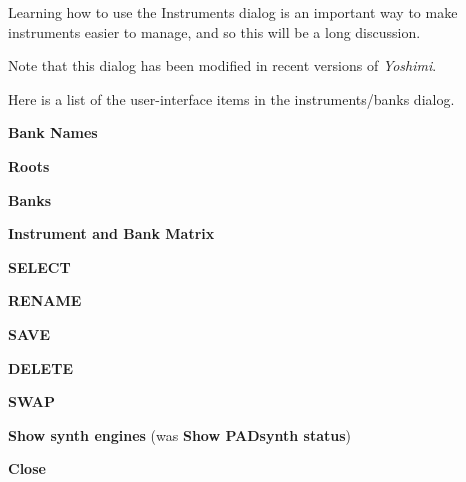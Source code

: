    Learning how to use the Instruments dialog is an important way to make
   instruments easier to manage, and so this will be a long discussion.




   


   Note that this dialog has been modified in recent versions of
   \textsl{Yoshimi}.

   Here is a list of the user-interface items in the instruments/banks dialog.

   \begin{enumber}
      \item \textbf{Bank Names}
      \item \textbf{Roots}
      \item \textbf{Banks}
      \item \textbf{Instrument and Bank Matrix}
      \item \textbf{SELECT}
      \item \textbf{RENAME}
      \item \textbf{SAVE}
      \item \textbf{DELETE}
      \item \textbf{SWAP}
      \item \textbf{Show synth engines}
         (was \textbf{Show PADsynth status})
      \item \textbf{Close}
   \end{enumber}

